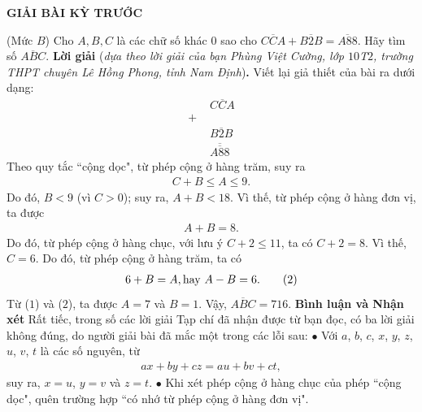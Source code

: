 	\begin{center}
		{\large{\textbf{\color{thachthuctoanhoc}GIẢI BÀI KỲ TRƯỚC}}}
	\end{center}
\begin{multicols}{2}
	\setlength{\abovedisplayskip}{4pt}
	\setlength{\belowdisplayskip}{4pt}
	{}
	(Mức $B$) Cho $A,B,C$ là các chữ số khác $0$ sao cho $\overline{CCA}+\overline{B2B}=\overline{A88}$. Hãy tìm số $\overline{ABC}$.
	\vskip 0.05cm
	\textbf{\color{thachthuctoanhoc}Lời giải} (\textit{dựa theo lời giải của bạn Phùng Việt Cường, lớp $10$T$2$, trường THPT chuyên Lê Hồng Phong, tỉnh Nam Định})\textbf{\color{thachthuctoanhoc}.}
	\vskip 0.05cm
	Viết lại giả thiết của bài ra dưới dạng:
	\begin{align*}
		&\,\,\overline{CCA}\\[-0.6ex]
		+&\\[-1ex]
		&\,\,\overline{B2B}\\[-0.6ex]
		&\overline{\,\,\overline{A88}\,\,}
	\end{align*}
	Theo quy tắc ``cộng dọc", từ phép cộng ở hàng trăm, suy ra
	\begin{align*}
		C + B \le A \le 9.
	\end{align*}
	Do đó, $B < 9$ (vì $C > 0$); suy ra, $A + B < 18$. Vì thế, từ phép cộng ở hàng đơn vị, ta được
	\begin{align*}
		A + B = 8. \tag{$1$}
	\end{align*}                                                                  
	Do đó, từ phép cộng ở hàng chục, với lưu ý $C + 2 \le 11$, ta có $C + 2 = 8$. Vì thế, $C = 6$. Do đó, từ phép cộng ở hàng trăm, ta có
	\begin{align*}
		6 + B = A, \text{\color{black} hay }A - B = 6. \tag{$2$}
	\end{align*}
	Từ ($1$) và ($2$), ta được $A = 7$ và $B = 1$.
	\vskip 0.05cm
	Vậy, $\overline {ABC}  = 716$.
	\vskip 0.05cm
	\textbf{\color{thachthuctoanhoc}Bình luận và Nhận xét}
	\vskip 0.05cm
	Rất tiếc, trong số các lời giải Tạp chí đã nhận được từ bạn đọc, có ba lời giải không đúng, do người giải bài đã mắc một trong các lỗi sau:
	\vskip 0.05cm
	$\bullet$  Với $a$, $b$, $c$, $x$, $y$, $z$, $u$, $v$, $t$ là các số nguyên, từ
	\begin{align*}
		ax + by + cz = au + bv + ct,
	\end{align*}
	suy ra, $x = u$, $y = v$ và $z = t$.
	\vskip 0.05cm
	$\bullet$  Khi xét phép cộng ở hàng chục của phép ``cộng dọc", quên trường hợp ``có nhớ từ phép cộng ở hàng đơn vị".

\end{multicols}
